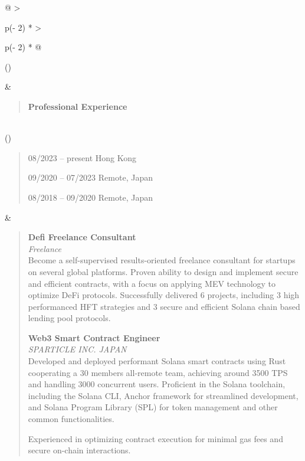\documentclass[
]{article}
\begin{document}
\begin{longtable}[]{@{}
  >{\raggedright\arraybackslash}p{(\columnwidth - 2\tabcolsep) * }
  >{\raggedright\arraybackslash}p{(\columnwidth - 2\tabcolsep) * }@{}}
\toprule()
\begin{minipage}[b]{\linewidth}\raggedright
\end{minipage} & \begin{minipage}[b]{\linewidth}\raggedright
\begin{quote}
\textbf{Professional Experience}
\end{quote}
\end{minipage} \\
\midrule()
\endhead
\begin{minipage}[t]{\linewidth}\raggedright
\begin{quote}
08/2023 -- present Hong Kong

09/2020 -- 07/2023 Remote, Japan

08/2018 -- 09/2020 Remote, Japan
\end{quote}
\end{minipage} & \begin{minipage}[t]{\linewidth}\raggedright
\begin{quote}
\textbf{Defi Freelance Consultant}\\
\emph{Freelance}\\
Become a self-supervised results-oriented freelance consultant for
startups on several global platforms. Proven ability to design and
implement secure and efficient contracts, with a focus on applying MEV
technology to optimize DeFi protocols. Successfully delivered 6
projects, including 3 high performanced HFT strategies and 3 secure and
efficient Solana chain based lending pool protocols.

\textbf{Web3 Smart Contract Engineer}\\
\emph{SPARTICLE INC. JAPAN}\\
Developed and deployed performant Solana smart contracts using Rust\\
cooperating a 30 members all-remote team, achieving around 3500 TPS and
handling 3000 concurrent users. Proficient in the Solana toolchain,
including the Solana CLI, Anchor framework for streamlined development,
and Solana Program Library (SPL) for token management and other common
functionalities.

Experienced in optimizing contract execution for minimal gas fees and
secure on-chain interactions.


\end{quote}
\end{minipage}
\end{longtable}
\end{document}
